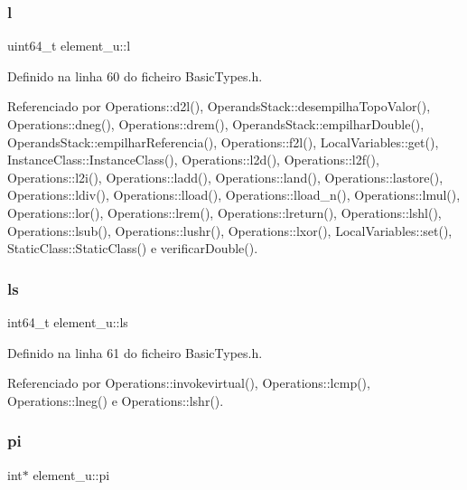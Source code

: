 \mbox{\label{unionelement__u_aca3c96df160bc775791470b98e15710f}} 
\subsubsection{\texorpdfstring{l}{l}}
{\footnotesize\ttfamily uint64\+\_\+t element\+\_\+u\+::l}



Definido na linha 60 do ficheiro Basic\+Types.\+h.



Referenciado por Operations\+::d2l(), Operands\+Stack\+::desempilha\+Topo\+Valor(), Operations\+::dneg(), Operations\+::drem(), Operands\+Stack\+::empilhar\+Double(), Operands\+Stack\+::empilhar\+Referencia(), Operations\+::f2l(), Local\+Variables\+::get(), Instance\+Class\+::\+Instance\+Class(), Operations\+::l2d(), Operations\+::l2f(), Operations\+::l2i(), Operations\+::ladd(), Operations\+::land(), Operations\+::lastore(), Operations\+::ldiv(), Operations\+::lload(), Operations\+::lload\+\_\+n(), Operations\+::lmul(), Operations\+::lor(), Operations\+::lrem(), Operations\+::lreturn(), Operations\+::lshl(), Operations\+::lsub(), Operations\+::lushr(), Operations\+::lxor(), Local\+Variables\+::set(), Static\+Class\+::\+Static\+Class() e verificar\+Double().

\mbox{\label{unionelement__u_af52b13fa38bfc4e5a98d4b868324ee27}} 
\subsubsection{\texorpdfstring{ls}{ls}}
{\footnotesize\ttfamily int64\+\_\+t element\+\_\+u\+::ls}



Definido na linha 61 do ficheiro Basic\+Types.\+h.



Referenciado por Operations\+::invokevirtual(), Operations\+::lcmp(), Operations\+::lneg() e Operations\+::lshr().

\mbox{\label{unionelement__u_a3c7acdaf4dc01ef8694967376100fc8f}} 
\subsubsection{\texorpdfstring{pi}{pi}}
{\footnotesize\ttfamily int$\ast$ element\+\_\+u\+::pi}



